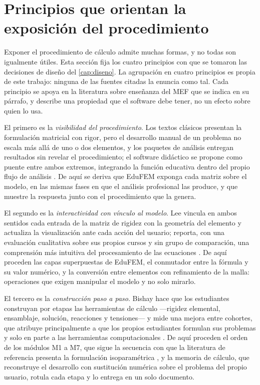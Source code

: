 \section{Principios que orientan la exposición del procedimiento}
\label{sec:fundamentos-pedagogicos}

Exponer el procedimiento de cálculo admite muchas formas, y no todas son igualmente útiles. Esta sección fija los cuatro principios con que se tomaron las decisiones de diseño del \autoref{cap:diseno}. La agrupación en cuatro principios es propia de este trabajo: ninguna de las fuentes citadas la enuncia como tal. Cada principio se apoya en la literatura sobre enseñanza del MEF que se indica en su párrafo, y describe una propiedad que el software debe tener, no un efecto sobre quien lo usa.

El primero es la \emph{visibilidad del procedimiento}. Los textos clásicos presentan la formulación matricial con rigor, pero el desarrollo manual de un problema no escala más allá de uno o dos elementos, y los paquetes de análisis entregan resultados sin revelar el procedimiento; el software didáctico se propone como puente entre ambos extremos, integrando la función educativa dentro del propio flujo de análisis \autocites[p.~157]{lee2015interactive}[p.~872]{lee2015eigenmodes}[p.~2]{bishay2020teaching}. De aquí se deriva que EduFEM exponga cada matriz sobre el modelo, en las mismas fases en que el análisis profesional las produce, y que muestre la respuesta junto con el procedimiento que la genera.

El segundo es la \emph{interactividad con vínculo al modelo}. Lee vincula en ambos sentidos cada entrada de la matriz de rigidez con la geometría del elemento y actualiza la visualización ante cada acción del usuario; reporta, con una evaluación cualitativa sobre sus propios cursos y sin grupo de comparación, una comprensión más intuitiva del procesamiento de las ecuaciones \autocites[pp.~158, 163, 166, 168]{lee2015interactive}[p.~874]{lee2015eigenmodes}. De aquí proceden las capas superpuestas de EduFEM, el conmutador entre la fórmula y su valor numérico, y la conversión entre elementos con refinamiento de la malla: operaciones que exigen manipular el modelo y no solo mirarlo.

El tercero es la \emph{construcción paso a paso}. Bishay hace que los estudiantes construyan por etapas las herramientas de cálculo —rigidez elemental, ensamblaje, solución, reacciones y tensiones— y mide una mejora entre cohortes, que atribuye principalmente a que los propios estudiantes formulan sus problemas y solo en parte a las herramientas computacionales \autocite[pp.~4-5, 13, 17]{bishay2020teaching}. De aquí proceden el orden de los módulos M1 a M7, que sigue la secuencia con que la literatura de referencia presenta la formulación isoparamétrica \autocite{bathe2014fem,cook2002concepts}, y la memoria de cálculo, que reconstruye el desarrollo con sustitución numérica sobre el problema del propio usuario, rotula cada etapa y lo entrega en un solo documento.

